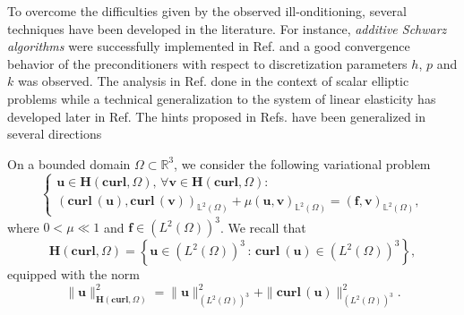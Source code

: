 To overcome the difficulties given by the observed ill-onditioning, several techniques have been developed in the literature. For instance, {\em additive Schwarz algorithms} were successfully  implemented in Ref. and a good convergence behavior of the preconditioners with respect to discretization parameters  $h$, $p$ and $k$ was observed. The analysis in
Ref. done in the context of scalar elliptic problems while a technical generalization to the system of linear elasticity has developed later in Ref. The hints proposed in Refs. have been generalized in several directions 








































\newpage


On a bounded domain $\Omega \subset \mathbb{R}^3$, we consider the following variational problem
\begin{equation}\label{eq:curl-variational-problem}
\begin{cases}
\bm{u} \in \bm{H}(\textbf{curl},\Omega), \, \forall \bm{v} \in \bm{H}(\textbf{curl},\Omega):\\
\left( \textbf{curl}\ (\bm{u}),\textbf{curl}\, (\bm{v})\right)_{\mathbb{L}^2(\Omega)} + \mu \left( \bm{u},\bm{v}\right)_{\mathbb{L}^2(\Omega)}=\left( \bm{f}, \bm{v}\right)_{\mathbb{L}^2(\Omega)}, 
\end{cases}
\end{equation}
where $0<\mu \ll 1$ and $\bm{f} \in \left(L^2(\Omega)\right)^3$. We recall that 
\begin{equation*}
\bm{H}(\textbf{curl},\Omega) = \left \{ \bm{u} \in  \left(L^2(\Omega)\right)^3 \,:\, \textbf{curl}\ (\bm{u}) \in \left(L^2(\Omega)\right)^3\right\},
\end{equation*}
equipped with the norm
\begin{equation*}
\|\bm{u}\|_{\bm{H}(\textbf{curl},\Omega)}^2=\|\bm{u}\|_{\left(L^2(\Omega)\right)^3}^2+\|\textbf{curl}\, (\bm{u})\|_{\left(L^2(\Omega)\right)^3}^2.
\end{equation*}




